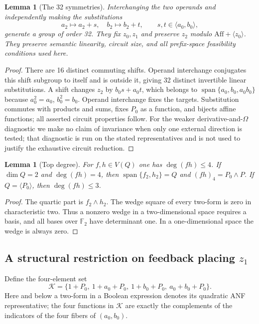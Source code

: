 \documentclass[11pt,a4paper]{article}
\theoremstyle{plain}
\newtheorem{lemma}[theorem]{Lemma}
\theoremstyle{remark}
\newcommand{\F}{\mathbb F_2}
\newcommand{\Aff}{\mathrm{Aff}}
\newcommand{\Span}{\operatorname{span}}
\begin{document}
\begin{lemma}[The 32 symmetries]\label{l2:lem:sym}
Interchanging the two operands and independently making the substitutions
\[
a_2\mapsto a_2+s,\quad b_2\mapsto b_2+t,
\qquad s,t\in\langle a_0,b_0\rangle,
\]
generate a group of order 32. They fix $z_0,z_1$ and preserve $z_2$ modulo $\Aff+\langle z_0\rangle$. They preserve semantic linearity, circuit size, and all prefix-space feasibility conditions used here.
\end{lemma}
\begin{proof}
There are 16 distinct commuting shifts. Operand interchange conjugates this shift subgroup to itself and is outside it, giving 32 distinct invertible linear substitutions. A shift changes $z_2$ by $b_0s+a_0t$, which belongs to $\Span\{a_0,b_0,a_0b_0\}$ because $a_0^2=a_0$, $b_0^2=b_0$. Operand interchange fixes the targets. Substitution commutes with products and sums, fixes $P_0$ as a function, and bijects affine functions; all asserted circuit properties follow. For the weaker derivative-and-$\Omega$ diagnostic we make no claim of invariance when only one external direction is tested; that diagnostic is run on the stated representatives and is not used to justify the exhaustive circuit reduction.
\end{proof}

\begin{lemma}[Top degree]\label{l2:lem:degree}
For $f,h\in V(Q)$ one has $\deg(fh)\le4$. If $\dim Q=2$ and $\deg(fh)=4$, then $\Span\{f_2,h_2\}=Q$ and $(fh)_4=P_0\wedge P$. If $Q=\langle P_0\rangle$, then $\deg(fh)\le3$.
\end{lemma}
\begin{proof}
The quartic part is $f_2\wedge h_2$. The wedge square of every two-form is zero in characteristic two. Thus a nonzero wedge in a two-dimensional space requires a basis, and all bases over $\F$ have determinant one. In a one-dimensional space the wedge is always zero.
\end{proof}

\subsection[A structural restriction on feedback placing z1]{A structural restriction on feedback placing $z_1$}
Define the four-element set
\[
\mathcal K=\{1+P_0,\ 1+a_0+P_0,\ 1+b_0+P_0,\ a_0+b_0+P_0\}.
\]
Here and below a two-form in a Boolean expression denotes its quadratic ANF representative; the four functions in $\mathcal K$ are exactly the complements of the indicators of the four fibers of $(a_0,b_0)$.
\end{document}
